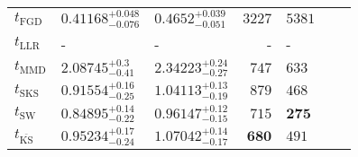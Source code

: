 \begin{tabular}{l|llr|llr}
	\midrule
	$t_{\mathrm{FGD}}$ & ${\mathbf{0.41168_{-0.076}^{+0.048}}}$ & ${\mathbf{0.4652_{-0.051}^{+0.039}}}$ & $3227$ & $5381$ \\
	$t_{\mathrm{LLR}}$ & - & - & - & - \\
	$t_{\mathrm{MMD}}$ & $2.08745_{-0.41}^{+0.3}$ & $2.34223_{-0.27}^{+0.24}$ & $747$ & $633$ \\
	$t_{\mathrm{SKS}}$ & $0.91554_{-0.25}^{+0.16}$ & $1.04113_{-0.19}^{+0.13}$ & $879$ & $468$ \\
	$t_{\mathrm{SW}}$ & $0.84895_{-0.22}^{+0.14}$ & $0.96147_{-0.15}^{+0.12}$ & $715$ & ${\mathbf{275}}$ \\
	$t_{\overline{\mathrm{KS}}}$ & $0.95234_{-0.24}^{+0.17}$ & $1.07042_{-0.17}^{+0.14}$ & ${\mathbf{680}}$ & $491$ \\
	\bottomrule
\end{tabular}